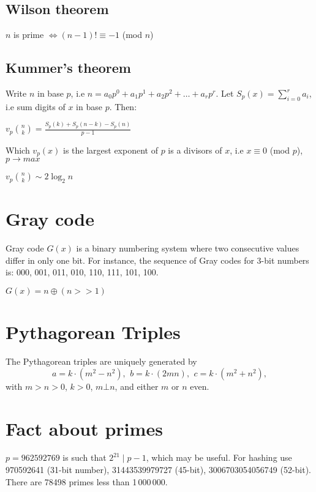     \subsection{Wilson theorem}
    $n$ is prime $\iff (n - 1)! \equiv -1$ (mod $n$)

    \subsection{Kummer's theorem}
        Write $n$ in base $p$, i.e $n = a_0 p^0 + a_1 p^1 + a_2 p^2 + \dots + a_r p^r$. Let $S_p(x) = \sum_{i = 0}^{r} a_i$, i.e sum digits of $x$ in base $p$. Then:
            
        $v_p\binom{n}{k} = \frac{S_p(k) + S_p(n - k) - S_p(n)}{p - 1}$

        Which $v_p(x)$ is the largest exponent of $p$ is a divisors of $x$, i.e $x \equiv 0$ (mod $p$), $p \rightarrow max$ 

        $v_p\binom{n}{k} \sim 2\log_2 n$
\section{Gray code}
    Gray code $G(x)$ is a binary numbering system where two consecutive values differ in only one bit.
    For instance, the sequence of Gray codes for 3-bit numbers is: 000, 001, 011, 010, 110, 111, 101, 100.
    
    $G(x) = n \oplus (n >> 1)$
\section{Pythagorean Triples}
 The Pythagorean triples are uniquely generated by
 \[ a=k\cdot (m^{2}-n^{2}),\ \,b=k\cdot (2mn),\ \,c=k\cdot (m^{2}+n^{2}), \]
 with $m > n > 0$, $k > 0$, $m \bot n$, and either $m$ or $n$ even.

\section{Fact about primes}
	$p=962592769$ is such that $2^{21} \mid p-1$, which may be useful. For hashing
	use 970592641 (31-bit number), 31443539979727 (45-bit), 3006703054056749
	(52-bit). There are 78498 primes less than 1\,000\,000.


